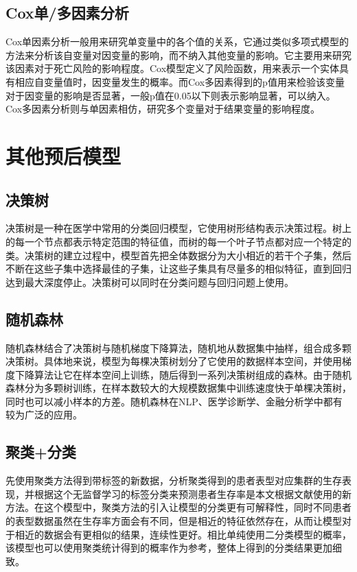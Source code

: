 \subsection{Cox单/多因素分析}

Cox单因素分析一般用来研究单变量中的各个值的关系，它通过类似多项式模型的方法来分析该自变量对因变量的影响，而不纳入其他变量的影响。它主要用来研究该因素对于死亡风险的影响程度。Cox模型定义了风险函数，用来表示一个实体具有相应自变量值时，因变量发生的概率。而Cox多因素得到的p值用来检验该变量对于因变量的影响是否显著，一般p值在0.05以下则表示影响显著，可以纳入。Cox多因素分析则与单因素相仿，研究多个变量对于结果变量的影响程度。

\section{其他预后模型}

\subsection{决策树}

决策树是一种在医学中常用的分类回归模型，它使用树形结构表示决策过程。树上的每一个节点都表示特定范围的特征值，而树的每一个叶子节点都对应一个特定的类。决策树的建立过程中，模型首先把全体数据分为大小相近的若干个子集，然后不断在这些子集中选择最佳的子集，让这些子集具有尽量多的相似特征，直到回归达到最大深度停止。决策树可以同时在分类问题与回归问题上使用。

\subsection{随机森林}

随机森林结合了决策树与随机梯度下降算法，随机地从数据集中抽样，组合成多颗决策树。具体地来说，模型为每棵决策树划分了它使用的数据样本空间，并使用梯度下降算法让它在样本空间上训练，随后得到一系列决策树组成的森林。由于随机森林分为多颗树训练，在样本数较大的大规模数据集中训练速度快于单棵决策树，同时也可以减小样本的方差。随机森林在NLP、医学诊断学、金融分析学中都有较为广泛的应用。

\subsection{聚类+分类}

先使用聚类方法得到带标签的新数据，分析聚类得到的患者表型对应集群的生存表现，并根据这个无监督学习的标签分类来预测患者生存率是本文根据文献\cite{life12060776}使用的新方法。在这个模型中，聚类方法的引入让模型的分类更有可解释性，同时不同患者的表型数据虽然在生存率方面会有不同，但是相近的特征依然存在，从而让模型对于相近的数据会有更相似的结果，连续性更好。相比单纯使用二分类模型的概率，该模型也可以使用聚类统计得到的概率作为参考，整体上得到的分类结果更加细致。
